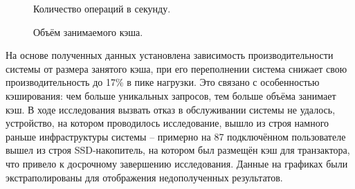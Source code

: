 \begin{figure}[!h]
	\centering
	\captionsetup{justification=centering}
	\caption{Количество операций в секунду.}
	\label{plt:time}
\end{figure}

\begin{figure}[!h]
	\centering
	\captionsetup{justification=centering}
	\caption{Объём занимаемого кэша.}
	\label{plt:mem}
\end{figure}


На основе полученных данных установлена зависимость производительности системы от размера занятого кэша, при его переполнении система снижает свою производительность до 17\% в пике нагрузки. Это связано с особенностью кэширования: чем больше уникальных запросов, тем больше объёма занимает кэш. В ходе исследования вызвать отказ в обслуживании системы не удалось, устройство, на котором проводилось исследование, вышло из строя намного раньше инфраструктуры системы -- примерно на 87 подключённом пользователе вышел из строя SSD-накопитель, на котором был размещён кэш для транзактора, что привело к досрочному завершению исследования. Данные на графиках были экстраполированы для отображения недополученных результатов.